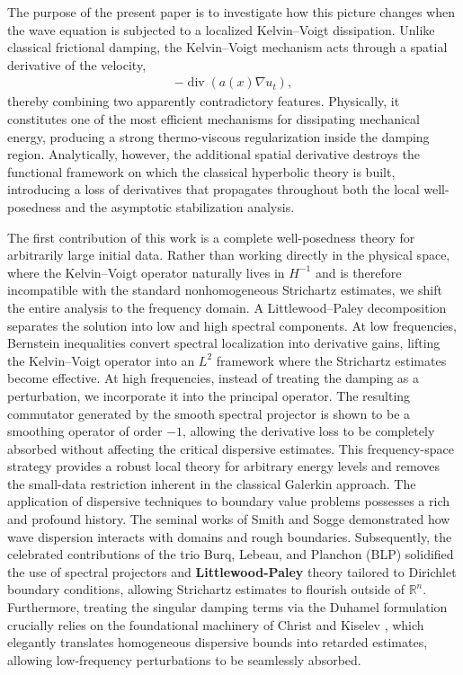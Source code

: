 \documentclass[11pt,letterpaper]{amsart}
\begin{document}
The purpose of the present paper is to investigate how this picture changes when the wave equation is subjected to a localized Kelvin--Voigt dissipation. Unlike classical frictional damping, the Kelvin--Voigt mechanism acts through a spatial derivative of the velocity,
\begin{eqnarray*}
-\operatorname{div}(a(x)\nabla u_t),
\end{eqnarray*}
thereby combining two apparently contradictory features. Physically, it constitutes one of the most efficient mechanisms for dissipating mechanical energy, producing a strong thermo-viscous regularization inside the damping region. Analytically, however, the additional spatial derivative destroys the functional framework on which the classical hyperbolic theory is built, introducing a loss of derivatives that propagates throughout both the local well-posedness and the asymptotic stabilization analysis.

The first contribution of this work is a complete well-posedness theory for arbitrarily large initial data. Rather than working directly in the physical space, where the Kelvin--Voigt operator naturally lives in $H^{-1}$ and is therefore incompatible with the standard nonhomogeneous Strichartz estimates, we shift the entire analysis to the frequency domain. A Littlewood--Paley decomposition separates the solution into low and high spectral components. At low frequencies, Bernstein inequalities convert spectral localization into derivative gains, lifting the Kelvin--Voigt operator into an $L^2$ framework where the Strichartz estimates become effective. At high frequencies, instead of treating the damping as a perturbation, we incorporate it into the principal operator. The resulting commutator generated by the smooth spectral projector is shown to be a smoothing operator of order $-1$, allowing the derivative loss to be completely absorbed without affecting the critical dispersive estimates. This frequency-space strategy provides a robust local theory for arbitrary energy levels and removes the small-data restriction inherent in the classical Galerkin approach.  The application of dispersive techniques to boundary value problems possesses a rich and profound history. The seminal works of Smith and Sogge \cite{SmithSogge1995} demonstrated how wave dispersion interacts with domains and rough boundaries. Subsequently, the celebrated contributions of the trio Burq, Lebeau, and Planchon \cite{BurqLebeauPlanchon} (BLP) solidified the use of spectral projectors and {\bf Littlewood-Paley} theory tailored to Dirichlet boundary conditions, allowing Strichartz estimates to flourish outside of $\mathbb{R}^n$. Furthermore, treating the singular damping terms via the Duhamel formulation crucially relies on the foundational machinery of Christ and Kiselev \cite{ChristKiselev}, which elegantly translates homogeneous dispersive bounds into retarded estimates, allowing low-frequency perturbations to be seamlessly absorbed.
\end{document}
